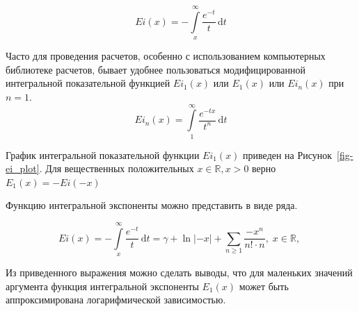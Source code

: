 \documentclass[
  russian,
  letterpaper,
  DIV=11,
  numbers=noendperiod,
  oneside]{scrartcl}
\begin{document}
\[
Ei(x)=-\int\limits_{x}^{\infty}\frac{e^{-t}}{t}\,\mathrm dt
\]

Часто для проведения расчетов, особенно с использованием компьютерных
библиотеке расчетов, бывает удобнее пользоваться модифицированной
интегральной показательной функцией \(Ei_1(x)\) или \(E_1(x)\) или
\(Ei_n(x)\) при \(n=1\). \[
 Ei_n(x) = \int\limits_{1}^{\infty}\frac{e^{-tx}}{t^n}\,\mathrm dt 
\]

График интегральной показательной функции \(Ei_1(x)\) приведен на
Рисунок~\ref{fig-ei_plot}. Для вещественных положительных
\(x\in\mathbb R, x>0\) верно \(E_1(x) = - Ei( -x)\)

Функцию интегральной экспоненты можно представить в виде ряда.

\[
Ei(x)=-\int\limits_{x}^{\infty}\frac{e^{-t}}{t}\,\mathrm dt=\gamma+\operatorname{ln}|-x|+\sum\limits_{n\ge1}\frac{{-x}^n}{n!\cdot n}, \;  x\in\mathbb R,\;
\]

Из приведенного выражения можно сделать выводы, что для маленьких
значений аргумента функция интегральной экспоненты \(E_1(x)\) может быть
аппроксимирована логарифмической зависимостью.
\end{document}
